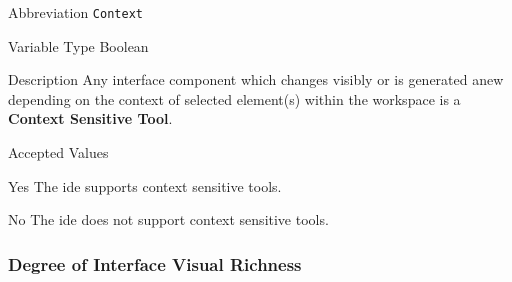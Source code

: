 \begin{AlignedDesc}
  \item[Abbreviation] \texttt{Context}

  \item[Variable Type] Boolean

  \item[Description] Any interface component which changes visibly or is
  generated anew depending on the context of selected element(s) within the
  workspace is a \textbf{Context Sensitive Tool}.

  \item[Accepted Values]

  \begin{AlignedDesc}
    \item[Yes] The \ac{ide} supports context sensitive tools.
    \item[No] The \ac{ide} does not support context sensitive tools.
  \end{AlignedDesc}

\end{AlignedDesc}

\subsubsection{Degree of Interface Visual Richness}
\label{subsubsec:toolrichness}

